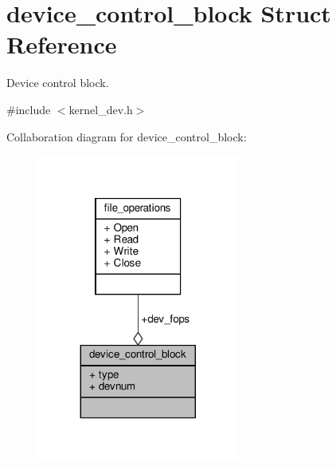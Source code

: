 \hypertarget{structdevice__control__block}{}\section{device\+\_\+control\+\_\+block Struct Reference}
\label{structdevice__control__block}


Device control block.  




{\ttfamily \#include $<$kernel\+\_\+dev.\+h$>$}



Collaboration diagram for device\+\_\+control\+\_\+block\+:\nopagebreak
\begin{figure}[H]
\begin{center}
\leavevmode
\includegraphics[width=188pt]{structdevice__control__block__coll__graph}
\end{center}
\end{figure}
